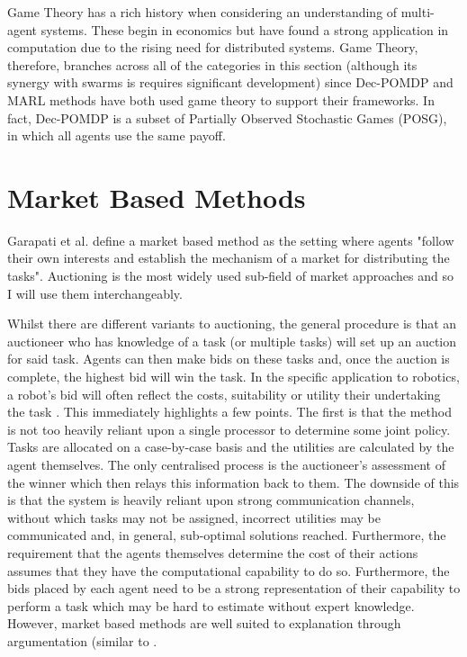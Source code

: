 \documentclass[../sample.tex]{subfiles}
\begin{document}
Game Theory has a rich history when considering an understanding of multi-agent systems. These begin
in economics but have found a strong application in computation due to the rising need for
distributed systems. Game Theory, therefore, branches across all of the categories in this section
(although its synergy with swarms is requires significant development) since Dec-POMDP and MARL
methods have both used game theory to support their frameworks. In fact, Dec-POMDP is a subset of
Partially Observed Stochastic Games (POSG), in which all agents use the same payoff.

\section{Market Based Methods}

Garapati et al. \cite{Garapati2018AMissions} define a market based method as the setting where
agents "follow their own interests and establish the mechanism of a market for distributing the
tasks". Auctioning is the most widely used sub-field of market approaches and so I will use them
interchangeably.

Whilst there are different variants to auctioning, the general procedure is that an auctioneer who
has knowledge of a task (or multiple tasks) will set up an auction for said task. Agents can then
make bids on these tasks and, once the auction is complete, the highest bid will win the task. In
the specific application to robotics, a robot's bid will often reflect the costs, suitability or
utility their undertaking the task \cite{BernardineDias2006Market-basedAnalysis}. This immediately
highlights a few points. The first is that the method is not too heavily reliant upon a single
processor to determine some joint policy. Tasks are allocated on a case-by-case basis and the
utilities are calculated by the agent themselves. The only centralised process is the auctioneer's
assessment of the winner which then relays this information back to them. The downside of this is
that the system is heavily reliant upon strong communication channels, without which tasks may not
be assigned, incorrect utilities may be communicated and, in general, sub-optimal solutions reached.
 Furthermore, the requirement that the agents themselves determine the cost of their actions assumes
that they have the computational capability to do so. Furthermore, the bids placed by each agent
need to be a strong representation of their capability to perform a task which may be hard to
estimate without expert knowledge. However, market based methods are well suited to explanation
through argumentation (similar to \cite{Jung2001DistributedArgumentation}.
\end{document}
